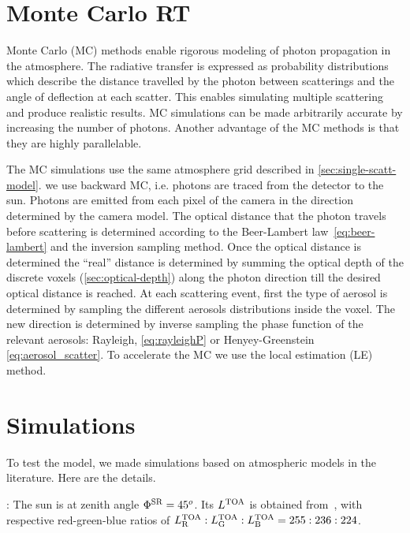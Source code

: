 \documentclass[10pt,letterpaper]{article}
\begin{document}

\section{Monte Carlo RT}
\label{sec:monte-carlo-simul}

Monte Carlo (MC) methods enable rigorous modeling of photon
propagation in the atmosphere. The radiative transfer is expressed as
probability distributions which describe the distance travelled by the
photon between scatterings and the angle of deflection at each
scatter.  This enables simulating multiple scattering and produce
realistic results.  MC simulations can be made arbitrarily accurate by
increasing the number of photons.  Another advantage of the MC methods
is that they are highly parallelable.

The MC simulations use the same atmosphere grid described in
\cref{sec:single-scatt-model}. we use backward MC, i.e. photons are
traced from the detector to the sun. Photons are emitted from each
pixel of the camera in the direction determined by the camera
model. The optical distance that the photon travels before scattering
is determined according to the Beer-Lambert law~\cref{eq:beer-lambert}
and the inversion sampling method. Once the optical distance is
determined the ``real'' distance is determined by summing the optical
depth of the discrete voxels (\cref{sec:optical-depth}) along the
photon direction till the desired optical distance is reached.  At
each scattering event, first the type of aerosol is determined by
sampling the different aerosols distributions inside the voxel. The
new direction is determined by inverse sampling the phase function of
the relevant aerosols: Rayleigh, \cref{eq:rayleighP} or
Henyey-Greenstein \cref{eq:aerosol_scatter}.  To accelerate the MC we
use the local estimation (LE) method.



\section{Simulations}
\label{sec:simul}

To test the model, we made simulations based on atmospheric models in
the literature. Here are the details.

: The sun is at zenith angle $\Phi^{\rm
  SR}=45^o$. Its $L^{\rm TOA}$ is obtained
from~\cite{BBradiance,sun_composition}, with respective red-green-blue
ratios of $L^{\rm TOA}_{\rm R}:L^{\rm TOA}_{\rm G}:L^{\rm TOA}_{\rm
  B}=255:236:224$.
\end{document}
